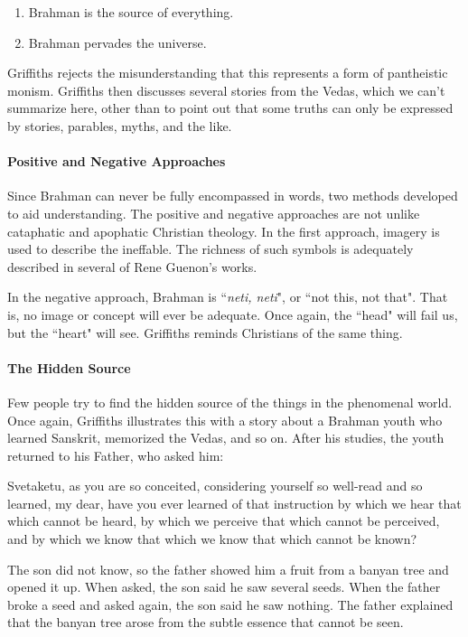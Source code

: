 \begin{enumerate}
\item Brahman is the source of everything. 
\item Brahman pervades the universe. 
\end{enumerate}
Griffiths rejects the misunderstanding that this represents a form of pantheistic monism. Griffiths then discusses several stories from the Vedas, which we can't summarize here, other than to point out that some truths can only be expressed by stories, parables, myths, and the like.

\paragraph{Positive and Negative Approaches}
Since Brahman can never be fully encompassed in words, two methods developed to aid understanding. The positive and negative approaches are not unlike cataphatic and apophatic Christian theology. In the first approach, imagery is used to describe the ineffable. The richness of such symbols is adequately described in several of Rene Guenon's works.

In the negative approach, Brahman is ``\emph{neti, neti}", or ``not this, not that". That is, no image or concept will ever be adequate. Once again, the ``head" will fail us, but the ``heart" will see. Griffiths reminds Christians of the same thing.

\paragraph{The Hidden Source}
Few people try to find the hidden source of the things in the phenomenal world. Once again, Griffiths illustrates this with a story about a Brahman youth who learned Sanskrit, memorized the Vedas, and so on. After his studies, the youth returned to his Father, who asked him:

\begin{quotex}
Svetaketu, as you are so conceited, considering yourself so well-read and so learned, my dear, have you ever learned of that instruction by which we hear that which cannot be heard, by which we perceive that which cannot be perceived, and by which we know that which we know that which cannot be known? 

\end{quotex}
The son did not know, so the father showed him a fruit from a banyan tree and opened it up. When asked, the son said he saw several seeds. When the father broke a seed and asked again, the son said he saw nothing. The father explained that the banyan tree arose from the subtle essence that cannot be seen.

